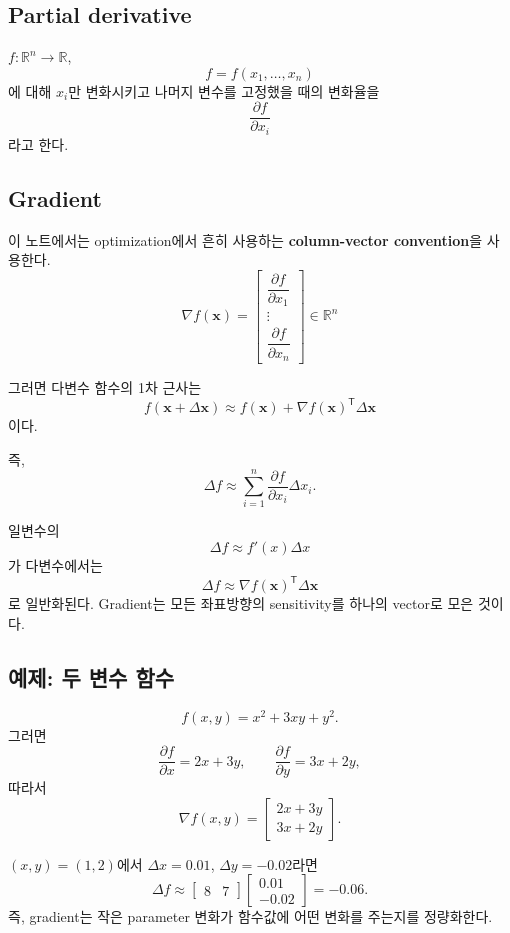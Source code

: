 \documentclass[11pt,a4paper]{article}
\newcommand{\R}{\mathbb{R}}
\newcommand{\grad}{\nabla}
\newcommand{\vect}[1]{\bm{#1}}
\newcommand{\T}{^{\mathsf T}}
\begin{document}
\subsection{Partial derivative}

$f:\R^n\to\R$,
\[
f=f(x_1,\ldots,x_n)
\]
에 대해 $x_i$만 변화시키고 나머지 변수를 고정했을 때의 변화율을
\[
\frac{\partial f}{\partial x_i}
\]
라고 한다.

\subsection{Gradient}

이 노트에서는 optimization에서 흔히 사용하는 \textbf{column-vector convention}을 사용한다.
\[
\boxed{
\grad f(\vect{x})
=
\begin{bmatrix}
\dfrac{\partial f}{\partial x_1}\\[0.4em]
\vdots\\[0.2em]
\dfrac{\partial f}{\partial x_n}
\end{bmatrix}
\in\R^n
}
\]

그러면 다변수 함수의 1차 근사는
\[
\boxed{
 f(\vect{x}+\Delta\vect{x})
\approx
 f(\vect{x})
 +
 \grad f(\vect{x})\T\Delta\vect{x}
}
\]
이다.

즉,
\[
\Delta f
\approx
\sum_{i=1}^n
\frac{\partial f}{\partial x_i}\Delta x_i.
\]

\begin{thinkbox}[해석]
일변수의
\[
\Delta f\approx f'(x)\Delta x
\]
가 다변수에서는
\[
\Delta f\approx \grad f(\vect{x})\T\Delta\vect{x}
\]
로 일반화된다. Gradient는 모든 좌표방향의 sensitivity를 하나의 vector로 모은 것이다.
\end{thinkbox}

\subsection{예제: 두 변수 함수}

\[
f(x,y)=x^2+3xy+y^2.
\]
그러면
\[
\frac{\partial f}{\partial x}=2x+3y,
\qquad
\frac{\partial f}{\partial y}=3x+2y,
\]
따라서
\[
\grad f(x,y)
=
\begin{bmatrix}
2x+3y\\
3x+2y
\end{bmatrix}.
\]

$(x,y)=(1,2)$에서 $\Delta x=0.01$, $\Delta y=-0.02$라면
\[
\Delta f
\approx
\begin{bmatrix}8&7\end{bmatrix}
\begin{bmatrix}0.01\\-0.02\end{bmatrix}
=-0.06.
\]
즉, gradient는 작은 parameter 변화가 함수값에 어떤 변화를 주는지를 정량화한다.
\end{document}

